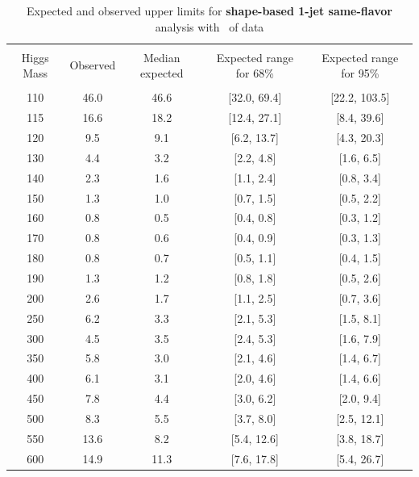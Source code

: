 \begin{table}[!hbp]
\begin{center}
\begin{tabular}{c c c c c}
\hline
\vspace{-3mm} && \\
 Higgs Mass   & Observed & Median expected & Expected range for 68\% & Expected range for 95\%   \\
\vspace{-3mm} && \\
\hline
110 & 46.0 & 46.6 & [32.0, 69.4] & [22.2, 103.5] \\
115 & 16.6 & 18.2 & [12.4, 27.1] & [8.4, 39.6] \\
120 & 9.5 & 9.1 & [6.2, 13.7] & [4.3, 20.3] \\
130 & 4.4 & 3.2 & [2.2, 4.8] & [1.6, 6.5] \\
140 & 2.3 & 1.6 & [1.1, 2.4] & [0.8, 3.4] \\
150 & 1.3 & 1.0 & [0.7, 1.5] & [0.5, 2.2] \\
160 & 0.8 & 0.5 & [0.4, 0.8] & [0.3, 1.2] \\
170 & 0.8 & 0.6 & [0.4, 0.9] & [0.3, 1.3] \\
180 & 0.8 & 0.7 & [0.5, 1.1] & [0.4, 1.5] \\
190 & 1.3 & 1.2 & [0.8, 1.8] & [0.5, 2.6] \\
200 & 2.6 & 1.7 & [1.1, 2.5] & [0.7, 3.6] \\
250 & 6.2 & 3.3 & [2.1, 5.3] & [1.5, 8.1] \\
300 & 4.5 & 3.5 & [2.4, 5.3] & [1.6, 7.9] \\
350 & 5.8 & 3.0 & [2.1, 4.6] & [1.4, 6.7] \\
400 & 6.1 & 3.1 & [2.0, 4.6] & [1.4, 6.6] \\
450 & 7.8 & 4.4 & [3.0, 6.2] & [2.0, 9.4] \\
500 & 8.3 & 5.5 & [3.7, 8.0] & [2.5, 12.1] \\
550 & 13.6 & 8.2 & [5.4, 12.6] & [3.8, 18.7] \\
600 & 14.9 & 11.3 & [7.6, 17.8] & [5.4, 26.7] \\
\hline
\end{tabular}
\caption{Expected and observed upper limits for {\bf shape-based 1-jet
    same-flavor} analysis with \intlumi\ of data}
\label{tab:sf0_cut}
\end{center}
\end{table}

